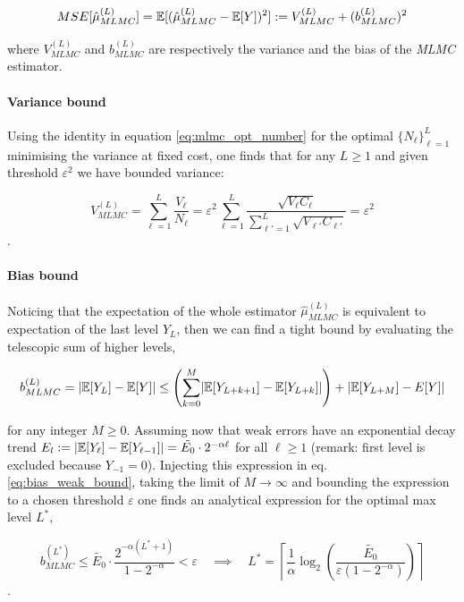 \begin{equation}\label{eq:mse_bound}
MSE[\hat{\mu}_{MLMC}^{(L)}] = \mathbb{E}[(\hat{\mu}_{MLMC}^{(L)} - \mathbb{E}[Y])^2] := V_{MLMC}^{(L)} + (b_{MLMC}^{(L)})^2
\end{equation}

where $V_{MLMC}^{(L)}$ and $b_{MLMC}^{(L)}$ are respectively the variance and the bias of the \textit{MLMC} estimator. 


\paragraph{Variance bound}
Using the identity in equation \ref{eq:mlmc_opt_number} for the optimal $\{N_\ell\}_{\ell = 1}^L$ minimising the variance at fixed cost, one finds that for any $L \ge 1$ and given threshold $\varepsilon^2$ we have bounded variance:

\begin{equation}\label{eq:var_bound}
V_{MLMC}^{(L)} = \sum_{\ell=1}^L \frac{V_\ell}{N_\ell} = \varepsilon^2 \sum_{\ell=1}^L \frac{\sqrt{V_\ell C_\ell}}{\sum_{\ell'=1}^L \sqrt{V_{\ell'} C_{\ell'}}}  = \varepsilon^2
\end{equation}.

\paragraph{Bias bound}
Noticing that the expectation of the whole estimator $\hat{\mu}_{MLMC}^{(L)}$ is equivalent to expectation of the last level $Y_L$, then we can find a tight bound by evaluating the telescopic sum of higher levels,

\begin{equation}\label{eq:bias_weak_bound}
b_{MLMC}^{(L)} = \lvert\mathbb{E}[Y_L] - \mathbb{E}[Y]\rvert \le \left(\sum_{k=0}^M \lvert\mathbb{E}[Y_{L+k+1}] - \mathbb{E}[Y_{L+k}]\rvert \right) + \lvert\mathbb{E}[Y_{L+M}] - E[Y]\rvert
\end{equation}

for any integer $M \ge 0$.
Assuming now that weak errors have an exponential decay trend $E_l := \lvert\mathbb{E}[Y_\ell] - \mathbb{E}[Y_{\ell-1}]\rvert = \tilde{E_0} \cdot 2^{-\alpha \ell}$ for all $\ell \ge 1$ (remark: first level is excluded because $Y_{-1} = 0$). Injecting this expression in eq. \ref{eq:bias_weak_bound}, taking the limit of $M \to \infty$ and bounding the expression to a chosen threshold $\varepsilon$ one finds an analytical expression for the optimal max level $L^*$,

\begin{equation}\label{eq:bias_bound}
b_{MLMC}^{(L^*)} \le \tilde{E_0} \cdot \frac{2^{-\alpha(L^*+1)}}{1 - 2^{-\alpha}} < \varepsilon
\quad
\implies
\quad
L^* = \left\lceil \frac{1}{\alpha} \log_2\left( \frac{\tilde{E_0}}{\varepsilon(1-2^{-\alpha})} \right)\right\rceil
\end{equation}.


